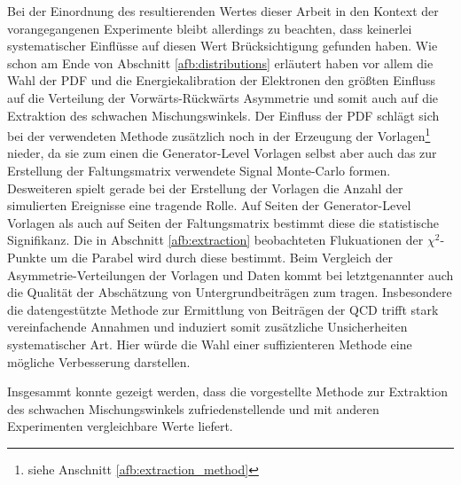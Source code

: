 Bei der Einordnung des resultierenden Wertes dieser Arbeit in den Kontext der
vorangegangenen Experimente bleibt allerdings zu beachten, dass keinerlei
systematischer Einflüsse auf diesen Wert Brücksichtigung gefunden haben. Wie
schon am Ende von Abschnitt \ref{afb:distributions} erläutert haben vor allem
die Wahl der \ac{PDF} und die Energiekalibration der Elektronen den größten
Einfluss auf die Verteilung der Vorwärts-Rückwärts Asymmetrie und somit auch
auf die Extraktion des schwachen Mischungswinkels. Der Einfluss der \ac{PDF}
schlägt sich bei der verwendeten Methode zusätzlich noch in der Erzeugung der
Vorlagen\footnote{siehe Anschnitt \ref{afb:extraction_method}} nieder, da sie
zum einen die Generator-Level Vorlagen selbst aber auch das zur Erstellung der
Faltungsmatrix verwendete Signal Monte-Carlo formen. Desweiteren spielt gerade
bei der Erstellung der Vorlagen die Anzahl der simulierten Ereignisse eine
tragende Rolle. Auf Seiten der Generator-Level Vorlagen als auch auf Seiten der
Faltungsmatrix bestimmt diese die statistische Signifikanz. Die in Abschnitt
\ref{afb:extraction} beobachteten Flukuationen der $\chi^2$-Punkte um die
Parabel wird durch diese bestimmt. Beim Vergleich der Asymmetrie-Verteilungen
der Vorlagen und Daten kommt bei letztgenannter auch die Qualität der
Abschätzung von Untergrundbeiträgen zum tragen. Insbesondere die datengestützte
Methode zur Ermittlung von Beiträgen der \ac{QCD} trifft stark vereinfachende
Annahmen und induziert somit zusätzliche Unsicherheiten systematischer Art.
Hier würde die Wahl einer suffizienteren Methode eine mögliche Verbesserung
darstellen.

Insgesammt konnte gezeigt werden, dass die vorgestellte Methode zur Extraktion
des schwachen Mischungswinkels zufriedenstellende und mit anderen Experimenten
vergleichbare Werte liefert.

